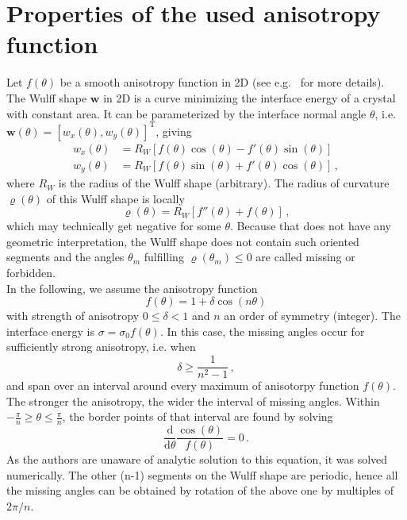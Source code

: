 	
	
	\section{Properties of the used anisotropy function}\label{sec_appendix_anisofun_props}
	Let $f(\theta)$ be a smooth anisotropy function in 2D (see e.g.~\cite{Kobayashi2001} for more details). The Wulff shape $\bm{w}$ in 2D is a curve minimizing the interface energy of a crystal with constant area. It can be parameterized by the interface normal angle $\theta$, i.e.  $\bm{w}(\theta)=[w_x(\theta),w_y(\theta)]^\mathrm{T}$, giving \cite{Burton1951,Kobayashi2001,Eggleston2001}
	\begin{align} 
		w_x(\theta) &= R_W[f(\theta)\cos(\theta) - f'(\theta)\sin(\theta)] \label{eq_wulff_parametrically_x}\\
		w_y(\theta) &= R_W[f(\theta)\sin(\theta) + f'(\theta)\cos(\theta)] \label{eq_wulff_parametrically_y}\,,
	\end{align}
	where $R_W$ is the radius of the Wulff shape (arbitrary). The radius of curvature $\varrho(\theta)$ of this Wulff shape is locally
	\begin{equation} \label{eq_Wulff_radius_curvature}
		\varrho(\theta) = R_W[f''(\theta) + f(\theta)] \,,
	\end{equation}
	which may technically get negative for some $\theta$. Because that does not have any geometric interpretation, the Wulff shape does not contain such oriented segments and the angles $\theta_m$ fulfilling $\varrho(\theta_m)\leq0$ are called missing or forbidden. \\
	In the following, we assume the anisotropy function 
	\begin{equation}
		f(\theta) = 1 + \delta\cos(n\theta)
	\end{equation}
	with strength of anisotropy $0\leq\delta<1$ and $n$ an order of symmetry (integer). The interface energy is $\sigma = \sigma_0f(\theta)$. In this case, the missing angles occur for sufficiently strong anisotropy, i.e. when
	\begin{equation} \label{eq_cond_stronganiso}
		\delta\geq\frac{1}{n^2-1} \,,
	\end{equation}
	and span over an interval around every maximum of anisotorpy function $f(\theta)$. The stronger the anisotropy, the wider the interval of missing angles. Within $-\frac{\pi}{n}\geq\theta\leq\frac{\pi}{n}$, the border points of that interval are found by solving~\cite{Eggleston2001}
	\begin{equation}
		\frac{\mathrm{d}}{\mathrm{d}\theta}\frac{\cos(\theta)}{f(\theta)} = 0 \,.
	\end{equation}
	As the authors are unaware of analytic solution to this equation, it was solved numerically. The other (n-1) segments on the Wulff shape are periodic, hence all the missing angles can be obtained by rotation of the above one by multiples of $2\pi/n$.
	
